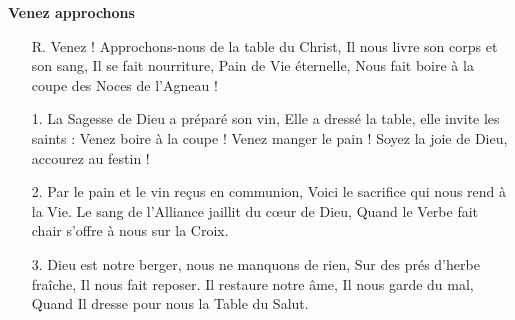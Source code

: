 \textbf{Venez approchons}
\begin{itemize}
\item[R.]
Venez ! Approchons-nous de la table du Christ,
Il nous livre son corps et son sang,
Il se fait nourriture, Pain de Vie éternelle,
Nous fait boire à la coupe des Noces de l’Agneau !
\item[1.]
La Sagesse de Dieu a préparé son vin,
Elle a dressé la table, elle invite les saints :
\og Venez boire à la coupe ! Venez manger le pain !
Soyez la joie de Dieu, accourez au festin ! \fg
\item[2.]
Par le pain et le vin reçus en communion,
Voici le sacrifice qui nous rend à la Vie.
Le sang de l’Alliance jaillit du cœur de Dieu,
Quand le Verbe fait chair s’offre à nous sur la Croix.
\item[3.]
Dieu est notre berger, nous ne manquons de rien,
Sur des prés d’herbe fraîche, Il nous fait reposer.
Il restaure notre âme, Il nous garde du mal,
Quand Il dresse pour nous la Table du Salut.
\end{itemize}
